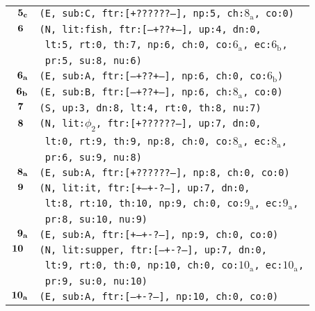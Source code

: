\documentclass{article}
\begin{document}
\begin{minipage}{\textwidth}
{\begin{tabular}{|r|l|}
    ${\textbf{\textrm{5}}_{\textbf{\textrm{c}}}}$ & \texttt{\texttt{(E,~sub:C,~ftr:[+??????--],~np:5,~ch:${\textrm{8}_{\textrm{a}}}$,~co:0)}} \\
    ${\textbf{\textrm{6}}_{\phantom{z}}}$ & \texttt{\texttt{(N,~lit:fish,~ftr:[---+??+--],~up:4,~dn:0,}} \\
    & \texttt{\texttt{~lt:5,~rt:0,~th:7,~np:6,~ch:0,~co:${\textrm{6}_{\textrm{a}}}$,~ec:${\textrm{6}_{\textrm{b}}}$,}} \\
    & \texttt{\texttt{~pr:5,~su:8,~nu:6)}} \\
    ${\textbf{\textrm{6}}_{\textbf{\textrm{a}}}}$ & \texttt{\texttt{(E,~sub:A,~ftr:[---+??+--],~np:6,~ch:0,~co:${\textrm{6}_{\textrm{b}}}$)}} \\
    ${\textbf{\textrm{6}}_{\textbf{\textrm{b}}}}$ & \texttt{\texttt{(E,~sub:B,~ftr:[---+??+--],~np:6,~ch:${\textrm{8}_{\textrm{a}}}$,~co:0)}} \\
    ${\textbf{\textrm{7}}_{\phantom{z}}}$ & \texttt{\texttt{(S,~up:3,~dn:8,~lt:4,~rt:0,~th:8,~nu:7)}} \\
    ${\textbf{\textrm{8}}_{\phantom{z}}}$ & \texttt{\texttt{(N,~lit:${\phi_{\textrm{2}}}$,~ftr:[+??????--],~up:7,~dn:0,}} \\
    & \texttt{\texttt{~lt:0,~rt:9,~th:9,~np:8,~ch:0,~co:${\textrm{8}_{\textrm{a}}}$,~ec:${\textrm{8}_{\textrm{a}}}$,}} \\
    & \texttt{\texttt{~pr:6,~su:9,~nu:8)}} \\
    ${\textbf{\textrm{8}}_{\textbf{\textrm{a}}}}$ & \texttt{\texttt{(E,~sub:A,~ftr:[+??????--],~np:8,~ch:0,~co:0)}} \\
    ${\textbf{\textrm{9}}_{\phantom{z}}}$ & \texttt{\texttt{(N,~lit:it,~ftr:[+--+-?---],~up:7,~dn:0,}} \\
    & \texttt{\texttt{~lt:8,~rt:10,~th:10,~np:9,~ch:0,~co:${\textrm{9}_{\textrm{a}}}$,~ec:${\textrm{9}_{\textrm{a}}}$,}} \\
    & \texttt{\texttt{~pr:8,~su:10,~nu:9)}} \\
    ${\textbf{\textrm{9}}_{\textbf{\textrm{a}}}}$ & \texttt{\texttt{(E,~sub:A,~ftr:[+--+-?---],~np:9,~ch:0,~co:0)}} \\
    ${\textbf{\textrm{10}}_{\phantom{z}}}$ & \texttt{\texttt{(N,~lit:supper,~ftr:[---+-?---],~up:7,~dn:0,}} \\
    & \texttt{\texttt{~lt:9,~rt:0,~th:0,~np:10,~ch:0,~co:${\textrm{10}_{\textrm{a}}}$,~ec:${\textrm{10}_{\textrm{a}}}$,}} \\
    & \texttt{\texttt{~pr:9,~su:0,~nu:10)}} \\
    ${\textbf{\textrm{10}}_{\textbf{\textrm{a}}}}$ & \texttt{\texttt{(E,~sub:A,~ftr:[---+-?---],~np:10,~ch:0,~co:0)}} \\
    \hline
  \end{tabular}
  }
\end{minipage}
\bigbreak
\end{document}
